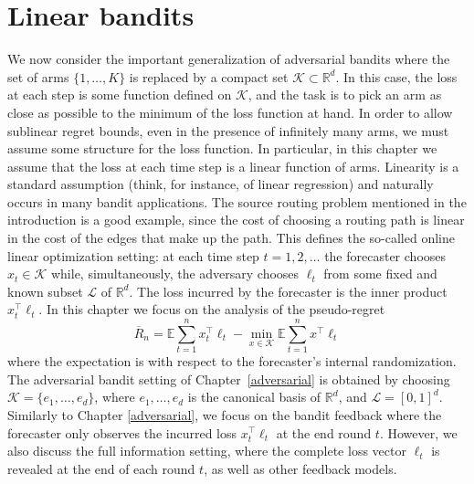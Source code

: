 \documentclass[11pt]{hackednow}
\newcommand{\E}{\mathbb{E}}
\newcommand{\R}{\mathbb{R}}
\newcommand{\cL}{\mathcal{L}}
\newcommand{\cK}{\mathcal{K}}
\newcommand{\oR}{\overline{R}}
\begin{document}
\chapter{Linear bandits}
\label{linear}
We now consider the important generalization of adversarial bandits where the set of arms $\{1,\hdots,K\}$ is replaced by a compact set $\cK \subset \R^d$. In this case, the loss at each step is some function defined on $\cK$, and the task is to pick an arm as close as possible to the minimum of the loss function at hand. In order to allow sublinear regret bounds, even in the presence of infinitely many arms, we must assume some structure for the loss function. In particular, in this chapter we assume that the loss at each time step is a linear function of arms. Linearity is a standard assumption (think, for instance, of linear regression) and naturally occurs in many bandit applications. The source routing problem mentioned in the introduction is a good example, since the cost of choosing a routing path is linear in the cost of the edges that make up the path. This defines the so-called online linear optimization setting: at each time step $t=1,2, \hdots$ the forecaster chooses $x_t \in \cK$ while, simultaneously, the adversary chooses $\ell_t$ from some fixed and known subset $\cL$ of $\R^d$. The loss incurred by the forecaster is the inner product $x_t^{\top}\ell_t$. In this chapter we focus on the analysis of the pseudo-regret
$$\oR_n = \E \sum_{t=1}^n x_t^{\top} \ell_t - \min_{x \in \cK} \E \sum_{t=1}^n x^{\top} \ell_t$$
where the expectation is with respect to the forecaster's internal randomization.
The adversarial bandit setting of Chapter~\ref{adversarial} is obtained by choosing $\cK=\{e_1, \hdots, e_d\}$, where $e_1, \hdots, e_d$ is the canonical basis of $\R^d$, and $\cL=[0,1]^d$. Similarly to Chapter \ref{adversarial}, we focus on the bandit feedback where the forecaster only observes the incurred loss $x_t^{\top} \ell_t$ at the end round $t$. However, we also discuss the full information setting, where the complete loss vector $\ell_t$ is revealed at the end of each round $t$, as well as other feedback models.
\end{document}
